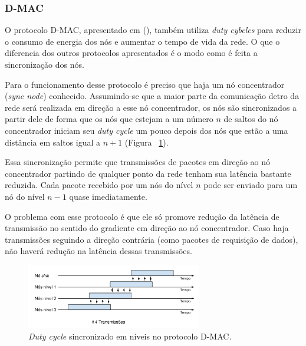 \subsubsection{D-MAC} 

O protocolo D-MAC, apresentado em  (\citeyear{1303264}), também utiliza \emph{duty cybcles} para reduzir o consumo de energia dos nós e aumentar o tempo de vida da rede. O que o diferencia dos outros protocolos apresentados é o modo como é feita a sincronização dos nós. 

Para o funcionamento desse protocolo é preciso que haja um nó concentrador (\emph{sync node}) conhecido. Assumindo-se que a maior parte da comunicação detro da rede será realizada em direção a esse nó concentrador, os nós são sincronizados a partir dele de forma que os nós que estejam a um número $n$ de saltos do nó concentrador iniciam seu \emph{duty cycle} um pouco depois dos nós que estão a uma distância em saltos igual a $n+1$ (Figura ~\ref{fig:DmacDutyCycles}).

Essa sincronização permite que transmissões de pacotes em direção ao nó concentrador partindo de qualquer ponto da rede tenham sua latência bastante reduzida. Cada pacote recebido por um nós do nível $n$ pode ser enviado para um nó do nível $n-1$ quase imediatamente.

O problema com esse protocolo é que ele só promove redução da latência de transmissão no sentido do gradiente em direção ao nó concentrador. Caso haja transmissões seguindo a direção contrária (como pacotes de requisição de dados), não haverá redução na latência dessas transmissões. 

\begin{figure}[!htb]
\centering
\includegraphics[width=290px,height=106px]{./Pictures/D-MACDutyCycles.png}
\caption{\emph{Duty cycle} sincronizado em níveis no protocolo D-MAC.} %
\label{fig:DmacDutyCycles} %
\end{figure}